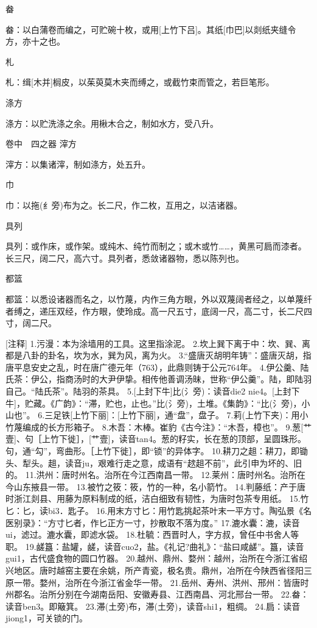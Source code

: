 \documentclass[12pt,UTF8]{ctexbook}
\begin{document}
畚

畚：以白蒲卷而编之，可贮碗十枚，或用[上竹下吕]。其纸[巾巴]以剡纸夹缝令方，亦十之也。

札

札：缉[木并]榈皮，以茱萸莫木夹而缚之，或截竹束而管之，若巨笔形。

涤方

涤方：以贮洗涤之余。用楸木合之，制如水方，受八升。

卷中　四之器
滓方

滓方：以集诸滓，制如涤方，处五升。

巾

巾：以拖(纟旁)布为之。长二尺，作二枚，互用之，以洁诸器。

具列

具列：或作床，或作架。或纯木、纯竹而制之；或木或竹……，黄黑可扃而漆者。长三尺，阔二尺，高六寸。具列者，悉敛诸器物，悉以陈列也。

都篮

都篮：以悉设诸器而名之，以竹蔑，内作三角方眼，外以双蔑阔者经之，以单蔑纤者缚之，递压双经，作方眼，使玲成。高一尺五寸，底阔一尺，高二寸，长二尺四寸，阔二尺。

[注释]
1.污漫：本为涂墙用的工具。这里指涂泥。 
2.坎上巽下离于中：坎、巽、离都是八卦的卦名，坎为水，巽为风，离为火。 
3.“盛唐灭胡明年铸”：盛唐灭胡，指唐平息安史之乱，时在唐广德元年（763），此鼎则铸于公元764年。 
4.伊公羹、陆氏茶：伊公，指商汤时的大尹伊挚。相传他善调汤昧，世称“伊公羹”。陆，即陆羽自己。“陆氏茶”。陆羽的茶具。 
5.[上封下牛]比(氵旁)：读音die2 nie4。[上封下牛]，贮藏。《广韵》：“滞，贮也，止也。”比(氵旁)，土堆。《集韵》：“比(氵旁)，小山也”。 
6.三足铁[上竹下丽]：[上竹下丽]，通“盘”，盘子。 
7.莉(上竹下夹)：用小竹蔑编成的长方形箱子。 
8.木吾：木棒。崔豹《古今注》：“木吾，樟也”。 
9.葱[艹壹]、句［上竹下徙］，[艹壹]，读音tan4。葱的籽实，长在葱的顶部，呈圆珠形。句，通“勾”，弯曲形。［上竹下徙］，即“锁”的异体字。 
10.耕刀之趄：耕刀，即锄头、犁头。趄，读音ju，艰难行走之意，成语有“趑趄不前”，此引申为坏的、旧的。 
11.洪州：唐时州名。治所在今江西南昌一带。 
12.莱州：唐时州名。治所在今山东掖县一带。 
13.被竹之筱：筱，竹的一种，名小箭竹。 
14.判藤纸：产于唐时浙江剡县、用藤为原料制成的纸，洁白细致有韧性，为唐时包茶专用纸。 
15.竹匕：匕，读bi3．匙子。 
16.用末方寸匕：用竹匙挑起茶叶末一平方寸。陶弘景《名医别录》：“方寸匕者，作匕正方一寸，抄散取不落为度。” 
17.漉水囊：漉，读音ui，滤过。漉水囊，即滤水袋。 
18.杜毓：西晋时人，字方叔，曾任中书舍人等职。 
19.鹾簋：盐罐，鹾，读音cuo2，盐。《礼记?曲礼》：“盐曰咸鹾”。簋，读音gui1，古代盛食物的圆口竹器。 
20.越州、鼎州、婺州：越州，治所在今浙江省绍兴地区。唐时越窑主要在余姚，所产青瓷，极名贵。鼎州，冶所在今陕西省径阳三原一带。婺州，治所在今浙江省金华一带。 
21.岳州、寿州、洪州、邢州：皆唐时州郡名。治所分别在今湖南岳阳、安徽寿县、江西南昌、河北邢台一带。 
22.畚：读音ben3。即簸箕。 
23.滞(土旁)布，滞(土旁)，读音shi1，粗绸。 
24.扃：读音jiong1，可关锁的门。 
\end{document}

